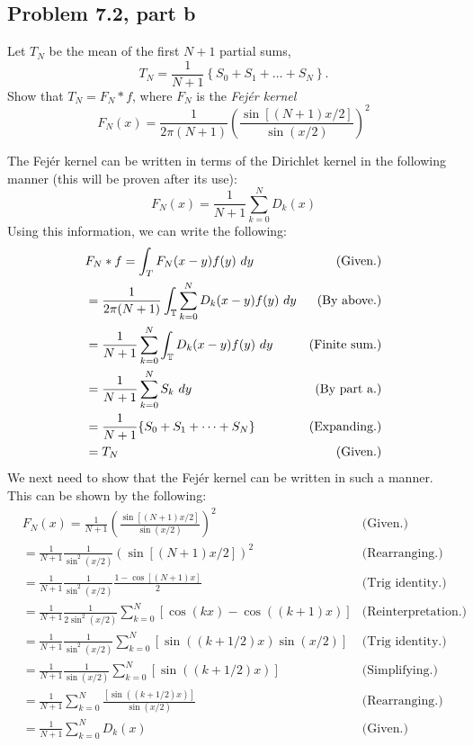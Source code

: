 \subsection{Problem 7.2, part b}
Let $T_N$ be the mean of the first $N+1$ partial sums,
\[T_N = \frac{1}{N+1} \left \{ S_0 + S_1 + \dots + S_N\right \}.\]
Show that $T_N = F_N \ast f$, where $F_N$ is the \textit{Fej\'er kernel}
\[F_N(x) = \frac{1}{2\pi (N+1)}\left( \frac{\sin [(N + 1)x/2]}{\sin(x/2)}\right)^2 \]
\partbreak
\begin{solution}
    
    The Fej\'er kernel can be written in terms of the Dirichlet kernel in the following manner (this will be proven after its use):
    \[F_N(x) = \frac{1}{N+1}\sum_{k = 0}^N D_k(x)\]
    Using this information, we can write the following:
    \tightalignbreak
    \begin{align*}
        &F_N \ast f = \int_T F_N(x - y)f(y) \ dy &\text{(Given.)}\\
        &= \frac{1}{2\pi (N+1)}\int_\scT \sum_{k = 0}^N D_k(x - y) f(y) \ dy &\text{(By above.)}\\
        &= \frac{1}{N+1}\sum_{k = 0}^N\int_{\scT}D_k(x - y) f(y) \ dy &\text{(Finite sum.)}\\
        &= \frac{1}{N+1}\sum_{k = 0}^NS_k \ dy &\text{(By part a.)}\\
        &= \frac{1}{N+1}\{ S_0 + S_1 + \cdots + S_N\} &\text{(Expanding.)}\\
        &= T_N &\text{(Given.)}
    \end{align*}
    \vspace{-12mm}\alignbreak
    \newpage
    We next need to show that the Fej\'er kernel can be written in such a manner. This can be shown by the following:
    \tightalignbreak
    \begin{align*}
        &F_N(x) = \frac{1}{N+1}\left(\frac{\sin\left[ (N+1)x/2\right]}{\sin(x/2)}\right)^2 &\text{(Given.)}\\
        &= \frac{1}{N+1}\frac{1}{\sin^2(x/2)}\left(\sin\left[ (N+1)x/2\right]\right)^2 &\text{(Rearranging.)}\\
        &= \frac{1}{N+1}\frac{1}{\sin^2(x/2)}\frac{1 - \cos \left[ (N+1)x\right]}{2} &\text{(Trig identity.)}\\
        &= \frac{1}{N+1}\frac{1}{2\sin^2(x/2)}\sum_{k = 0}^N \left[ \cos(kx) - \cos((k+1)x)\right] &\text{(Reinterpretation.)}\\
        &= \frac{1}{N+1}\frac{1}{\sin^2(x/2)}\sum_{k = 0}^N \left[ \sin((k+1/2)x) \sin(x/2)\right] &\text{(Trig identity.)}\\
        &= \frac{1}{N+1}\frac{1}{\sin(x/2)}\sum_{k = 0}^N \left[ \sin((k+1/2)x) \right] &\text{(Simplifying.)}\\
        &= \frac{1}{N+1}\sum_{k = 0}^N \frac{\left[ \sin((k+1/2)x) \right]}{\sin(x/2)} &\text{(Rearranging.)}\\
        &= \frac{1}{N+1}\sum_{k = 0}^N D_k(x) &\text{(Given.)} 
    \end{align*}
    \vspace{-12mm}\alignbreak
\end{solution}

